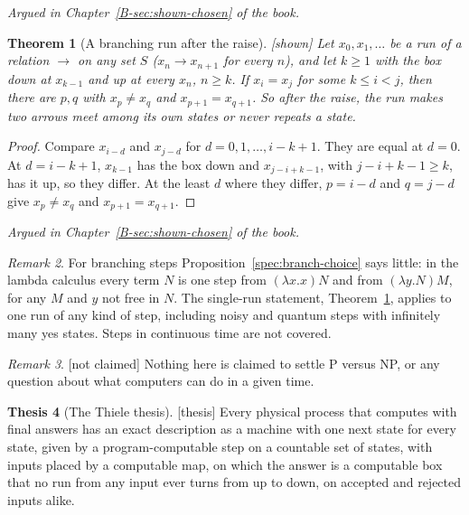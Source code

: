 \documentclass[11pt, a4paper]{article}
\theoremstyle{plain}
\newtheorem{theorem}{Theorem}[section]
\theoremstyle{definition}
\newtheorem{thesis}[theorem]{Thesis}
\theoremstyle{remark}
\newtheorem{remark}[theorem]{Remark}
\newcommand{\argued}[1]{\par\noindent\textit{Argued in Chapter~\ref{B-#1} of the book.}\par}
\newcommand{\kind}[1]{\textup{[#1]}}
\begin{document}
\argued{sec:shown-chosen}

\begin{theorem}[A branching run after the raise]\label{spec:branch-run} \kind{shown}
Let $x_0,x_1,\dots$ be a run of a relation $\to$ on any set $S$ ($x_n\to x_{n+1}$ for every $n$), and let
$k\ge1$ with the box down at $x_{k-1}$ and up at every $x_n$, $n\ge k$. If $x_i=x_j$ for some $k\le i<j$, then
there are $p,q$ with $x_p\ne x_q$ and $x_{p+1}=x_{q+1}$. So after the raise, the run makes two arrows meet among
its own states or never repeats a state.
\end{theorem}

\begin{proof}
Compare $x_{i-d}$ and $x_{j-d}$ for $d=0,1,\dots,i-k+1$. They are equal at $d=0$. At $d=i-k+1$, $x_{k-1}$ has
the box down and $x_{j-i+k-1}$, with $j-i+k-1\ge k$, has it up, so they differ. At the least $d$ where they
differ, $p=i-d$ and $q=j-d$ give $x_p\ne x_q$ and $x_{p+1}=x_{q+1}$.
\end{proof}

\argued{sec:shown-chosen}

\begin{remark}\label{spec:lambda}
For branching steps Proposition~\ref{spec:branch-choice} says little: in the lambda calculus every term $N$ is
one step from $(\lambda x.x)N$ and from $(\lambda y.N)M$, for any $M$ and $y$ not free in $N$. The single-run
statement, Theorem~\ref{spec:branch-run}, applies to one run of any kind of step, including noisy and quantum
steps with infinitely many yes states. Steps in continuous time are not covered.
\end{remark}

\begin{remark}\label{spec:p-np} \kind{not claimed}
Nothing here is claimed to settle P versus NP, or any question about what computers can do in a given time.
\end{remark}

\begin{thesis}[The Thiele thesis]\label{spec:thiele-thesis} \kind{thesis}
Every physical process that computes with final answers has an exact description as a machine with one next
state for every state, given by a program-computable step on a countable set of states, with inputs placed
by a computable map, on which the answer is a computable box that no run from any input ever turns from up
to down, on accepted and rejected inputs alike.
\end{thesis}
\end{document}
